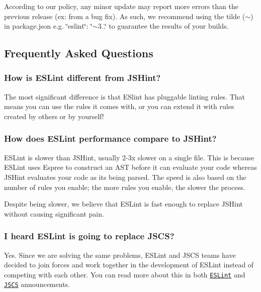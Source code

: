 According to our policy, any minor update may report more errors than the previous release (ex\+: from a bug fix). As such, we recommend using the tilde ({\ttfamily $\sim$}) in {\ttfamily package.\+json} e.\+g. {\ttfamily \char`\"{}eslint\char`\"{}\+: \char`\"{}$\sim$3..\char`\"{}} to guarantee the results of your builds.

\subsection*{Frequently Asked Questions}

\subsubsection*{How is E\+S\+Lint different from J\+S\+Hint?}

The most significant difference is that E\+Slint has pluggable linting rules. That means you can use the rules it comes with, or you can extend it with rules created by others or by yourself!

\subsubsection*{How does E\+S\+Lint performance compare to J\+S\+Hint?}

E\+S\+Lint is slower than J\+S\+Hint, usually 2-\/3x slower on a single file. This is because E\+S\+Lint uses Espree to construct an A\+ST before it can evaluate your code whereas J\+S\+Hint evaluates your code as it\textquotesingle{}s being parsed. The speed is also based on the number of rules you enable; the more rules you enable, the slower the process.

Despite being slower, we believe that E\+S\+Lint is fast enough to replace J\+S\+Hint without causing significant pain.

\subsubsection*{I heard E\+S\+Lint is going to replace J\+S\+CS?}

Yes. Since we are solving the same problems, E\+S\+Lint and J\+S\+CS teams have decided to join forces and work together in the development of E\+S\+Lint instead of competing with each other. You can read more about this in both \href{http://eslint.org/blog/2016/04/welcoming-jscs-to-eslint}{\tt E\+S\+Lint} and \href{https://medium.com/@markelog/jscs-end-of-the-line-bc9bf0b3fdb2#.u76sx334n}{\tt J\+S\+CS} announcements.

